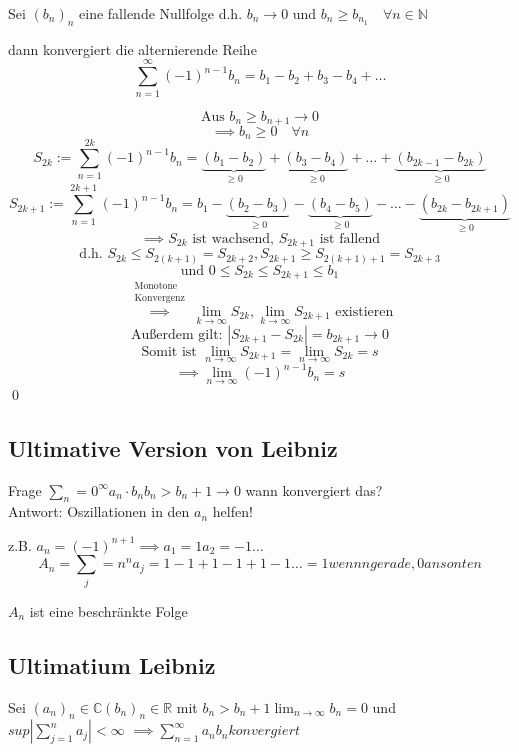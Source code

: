\documentclass[fleqn]{scrbook}
\newcommand{\R}{\mathbb{R}}
\newcommand{\N}{\mathbb{N}}
\renewenvironment{proof}{{\bfseries Beweis }}{\qed}
\begin{document}
Sei $(b_n)_n$ eine fallende Nullfolge d.h. $b_n \to 0$ und $b_n \geq b_{n_1} \quad \forall n \in \N$ 

dann konvergiert die alternierende Reihe
\[\sum_{n=1}^\infty (-1)^{n-1} b_n = b_1-b_2+b_3-b_4+\ldots \]

\begin{proof}
 \[\text{Aus } b_n \geq b_{n+1} \to 0\]
 \[\implies b_n \geq 0 \quad \forall n\]
 \[S_{2k}:=\sum_{n=1}^{2k} (-1)^{n-1} b_n = \underbrace{(b_1-b_2)}_{\geq 0}+\underbrace{(b_3-b_4)}_{\geq 0}+\ldots+\underbrace{(b_{2k-1}-b_{2k})}_{\geq 0}\]
 \[S_{2k+1}:=\sum_{n=1}^{2k+1} (-1)^{n-1} b_n = b_1 - \underbrace{(b_2-b_3)}_{\geq 0}-\underbrace{(b_4-b_5)}_{\geq 0}-\ldots-\underbrace{(b_{2k}-b_{2k+1})}_{\geq 0}\]
 \[\implies S_{2k} \text{ ist wachsend, } S_{2k+1} \text{ ist fallend}\]
 \[\text{d.h. } S_{2k} \leq S_{2(k+1)} = S_{2k+2}, S_{2k+1} \geq S_{2(k+1)+1} = S_{2k+3}\]
 \[\text{und } 0\leq S_{2k} \leq S_{2k+1} \leq b_1\]
 \[\stackrel{\begin{array}{l}\text{Monotone}\\\text{Konvergenz}\end{array}}{\implies} \lim_{k \to \infty} S_{2k}, \lim_{k \to \infty} S_{2k+1} \text{ existieren} \]
 \[\text{Außerdem gilt: } |S_{2k+1}-S_{2k}|=b_{2k+1} \to 0\]
 \[\text{Somit ist } \lim_{n\to \infty} S_{2k+1} = \lim_{n\to \infty} S_{2k} = s\]
 \[\implies \lim_{n \to \infty} (-1)^{n-1} b_n=s\] 
\end{proof}

\subsection{Ultimative Version von Leibniz}
Frage $\sum_n=0^{\infty} a_n \cdot b_n b_n > b_n+1 \to 0$ wann konvergiert das? \\
Antwort: Oszillationen in den $a_n$ helfen!

z.B. $a_n = (-1)^{n+1} \implies a_1 = 1 a_2 = -1 \ldots $
$$A_n = \sum_j=n^{n} a_j = 1-1+1-1+1-1 \ldots = 1 wenn n gerade, 0 ansonten$$

$A_n$ ist eine beschränkte Folge

\subsection{Ultimatium Leibniz}
Sei $(a_n)_n \in \mathbb{C} (b_n)_n \in \R$ mit $b_n > b_n+1 \lim_{n \to \infty} b_{n} = 0 $ und $sup | \sum_{j=1}^{n} a_j| < \infty$
$\implies  \sum_{n=1}^{\infty} a_n b_n konvergiert$
\end{document}
